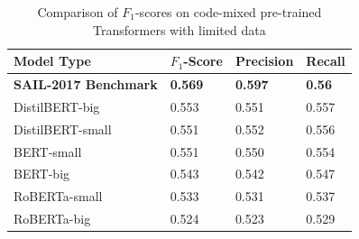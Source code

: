 \documentclass[conference]{IEEEtran}
\begin{document}
\begin{table}[htbp]
    \centering
    \caption{Comparison of $F_1$-scores on code-mixed pre-trained Transformers with limited data}
    \label{tab:results_hinglish}
    \begin{tabular}{|p{}|p{}|p{}|p{}|}
    \hline
       \textbf{Model Type} & \textbf{$F_1$-Score} & \textbf{Precision} & \textbf{Recall}\\ 
\hline
        \textbf{SAIL-2017   Benchmark} & \textbf{0.569}  & \textbf{0.597} & \textbf{0.56} \\ \hline
        DistilBERT-big                  & 0.553 & 0.551 & 0.557 \\ 
        DistilBERT-small                & 0.551  & 0.552 & 0.556 \\ \hline
        BERT-small                      & 0.551 & 0.550  & 0.554 \\ 
        BERT-big                        & 0.543 & 0.542 & 0.547 \\ \hline
        RoBERTa-small                   & 0.533 & 0.531 & 0.537 \\
        RoBERTa-big                     & 0.524 & 0.523 & 0.529 \\ \hline
        
    \end{tabular}
\end{table}
\end{document}
